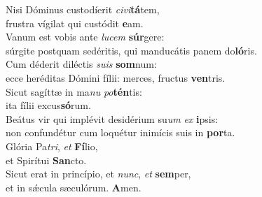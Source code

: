 \evenverse Nisi Dóminus custodíerit \textit{ci}\textit{vi}\textbf{tá}tem,~\*\\
\evenverse frustra vígilat qui custódit \textbf{e}am.\\
\oddverse Vanum est vobis ante \textit{lu}\textit{cem} \textbf{súr}gere:~\*\\
\oddverse súrgite postquam sedéritis, qui manducátis panem do\textbf{ló}ris.\\
\evenverse Cum déderit diléctis \textit{su}\textit{is} \textbf{som}num:~\*\\
\evenverse ecce heréditas Dómini fílii: merces, fructus \textbf{ven}tris.\\
\oddverse Sicut sagíttæ in ma\textit{nu} \textit{po}\textbf{tén}tis:~\*\\
\oddverse ita fílii excus\textbf{só}rum.\\
\evenverse Beátus vir qui implévit desidérium su\textit{um} \textit{ex} \textbf{i}psis:~\*\\
\evenverse non confundétur cum loquétur inimícis suis in \textbf{por}ta.\\
\oddverse Glória Pa\textit{tri}, \textit{et} \textbf{Fí}lio,~\*\\
\oddverse et Spirítui \textbf{San}cto.\\
\evenverse Sicut erat in princípio, et \textit{nunc}, \textit{et} \textbf{sem}per,~\*\\
\evenverse et in sǽcula sæculórum. \textbf{A}men.\\
